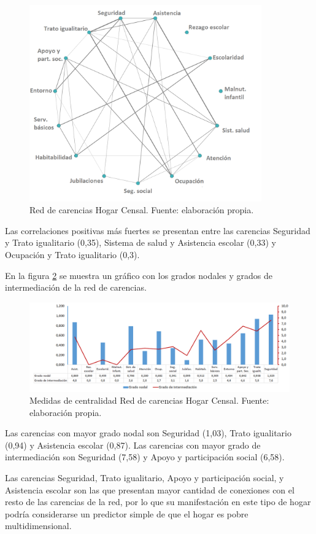 \documentclass[12pt,letterpaper,spanish]{article}
\begin{document}
\begin{figure}[H]
  \centering
    \includegraphics[width=10cm]{Grafos/grafo_censal_pos.png}
    \caption{Red de carencias Hogar Censal. Fuente: elaboración propia.}
    \label{RedCensalpos}
\end{figure}


Las correlaciones positivas más fuertes se presentan entre las carencias Seguridad y Trato igualitario (0,35), Sistema de salud y Asistencia escolar (0,33) y Ocupación y Trato igualitario (0,3). 

En la figura \ref{CenCensal} se muestra un gráfico con los grados nodales y grados de intermediación de la red de carencias.

\begin{figure}[H]
    \centering
    \includegraphics[width=\textwidth]{Grafos/nc_censal.png}
    \caption{Medidas de centralidad Red de carencias Hogar Censal. Fuente: elaboración propia.}
    \label{CenCensal}
\end{figure}
Las carencias con mayor grado nodal son Seguridad (1,03), Trato igualitario (0,94) y Asistencia escolar (0,87). Las carencias con mayor grado de intermediación son Seguridad (7,58) y Apoyo y participación social (6,58).

Las carencias Seguridad, Trato igualitario, Apoyo y participación social, y Asistencia escolar son las que presentan mayor cantidad de conexiones con el resto de las carencias de la red, por lo que su manifestación en este tipo de hogar podría considerarse un predictor simple de que el hogar es pobre multidimensional. 
\end{document}
